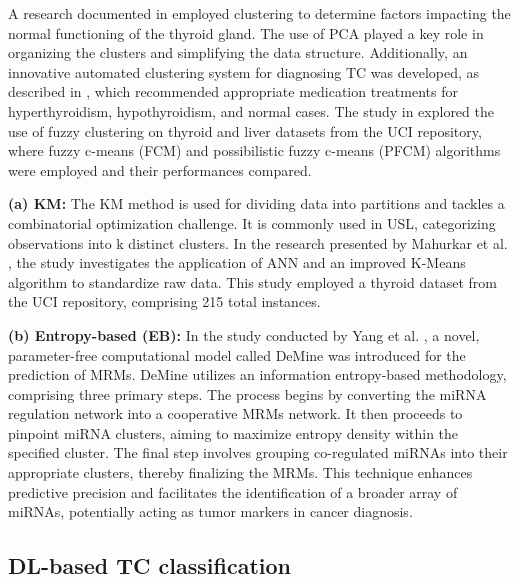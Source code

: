 \documentclass[a4paper,fleqn]{cas-sc}
\begin{document}
A research documented in \cite{chandel2020analysing} employed clustering to determine factors impacting the normal functioning of the thyroid gland. The use of \ac{PCA} played a key role in organizing the clusters and simplifying the data structure. Additionally, an innovative automated clustering system for diagnosing TC was developed, as described in \cite{katikireddy2020performa}, which recommended appropriate medication treatments for hyperthyroidism, hypothyroidism, and normal cases. The study in \cite{venkataramana2018comparative} explored the use of fuzzy clustering on thyroid and liver datasets from the UCI repository, where fuzzy c-means (FCM) and possibilistic fuzzy c-means (PFCM) algorithms were employed and their performances compared.

\vskip2mm

\noindent \textbf{(a) \Ac{KM}:} The \ac{KM} method is used for dividing data into partitions and tackles a combinatorial optimization challenge. It is commonly used in \ac{USL}, categorizing observations into k distinct clusters. In the research presented by Mahurkar et al. \cite{mahurkar2017normalization}, the study investigates the application of \ac{ANN} and an improved K-Means algorithm to standardize raw data. This study employed a thyroid dataset from the UCI repository, comprising 215 total instances.

\vskip2mm

\noindent \textbf{(b) Entropy-based (EB):} In the study conducted by Yang et al. \cite{yang2019information}, a novel, parameter-free computational model called DeMine was introduced for the prediction of \acp{MRM}. DeMine utilizes an information entropy-based methodology, comprising three primary steps. The process begins by converting the miRNA regulation network into a cooperative \acp{MRM} network. It then proceeds to pinpoint miRNA clusters, aiming to maximize entropy density within the specified cluster. The final step involves grouping co-regulated miRNAs into their appropriate clusters, thereby finalizing the \acp{MRM}. This technique enhances predictive precision and facilitates the identification of a broader array of miRNAs, potentially acting as tumor markers in cancer diagnosis.

\subsection{DL-based TC classification}
\end{document}
